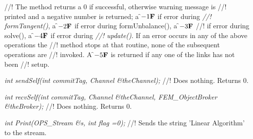 //! The method returns a 0 if successful, otherwise warning message is
//! printed and a negative number is returned; a \f$-1{\bf F}$ if error during {\em
//! formTangent()}, a \f$-2{\bf F}$ if error during formUnbalance(), a \f$-3{\bf F}$
//! if error during solve(), a \f$-4{\bf F}$ if error during {\em
//! update()}. If an error occurs in any of the above operations the
//! method stops at that routine, none of the subsequent operations are
//! invoked. A \f$-5{\bf F}$ is returned if any one of the links has not been
//! setup.


{\em int sendSelf(int commitTag, Channel \&theChannel);}
//! Does  nothing. Returns 0.


{\em int recvSelf(int commitTag, Channel \&theChannel, FEM\_ObjectBroker
\&theBroker);} 
//! Does nothing. Returns 0.

{\em int Print(OPS\_Stream \&s, int flag =0);}
//! Sends the string 'Linear Algorithm' to the stream.
